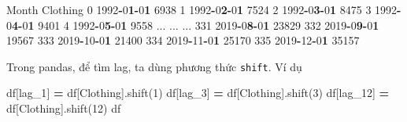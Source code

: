 \documentclass[
]{book}
\newenvironment{Shaded}{\begin{snugshade}}{\end{snugshade}}
\newcommand{\DecValTok}[1]{\textcolor[rgb]{0.00,0.00,0.81}{#1}}
\newcommand{\ErrorTok}[1]{\textcolor[rgb]{0.64,0.00,0.00}{\textbf{#1}}}
\newcommand{\NormalTok}[1]{#1}
\newcommand{\OperatorTok}[1]{\textcolor[rgb]{0.81,0.36,0.00}{\textbf{#1}}}
\newcommand{\StringTok}[1]{\textcolor[rgb]{0.31,0.60,0.02}{#1}}
\begin{document}
\begin{Shaded}
\begin{Highlighting}[]
\NormalTok{         Month  Clothing}
\DecValTok{0}   \DecValTok{1992}\OperatorTok{{-}}\DecValTok{0}\ErrorTok{1}\OperatorTok{{-}}\DecValTok{0}\ErrorTok{1}  \DecValTok{6938}
\DecValTok{1}   \DecValTok{1992}\OperatorTok{{-}}\DecValTok{0}\ErrorTok{2}\OperatorTok{{-}}\DecValTok{0}\ErrorTok{1}  \DecValTok{7524}
\DecValTok{2}   \DecValTok{1992}\OperatorTok{{-}}\DecValTok{0}\ErrorTok{3}\OperatorTok{{-}}\DecValTok{0}\ErrorTok{1}  \DecValTok{8475}
\DecValTok{3}   \DecValTok{1992}\OperatorTok{{-}}\DecValTok{0}\ErrorTok{4}\OperatorTok{{-}}\DecValTok{0}\ErrorTok{1}  \DecValTok{9401}
\DecValTok{4}   \DecValTok{1992}\OperatorTok{{-}}\DecValTok{0}\ErrorTok{5}\OperatorTok{{-}}\DecValTok{0}\ErrorTok{1}  \DecValTok{9558}
\NormalTok{... ... ...}
\DecValTok{331} \DecValTok{2019}\OperatorTok{{-}}\DecValTok{0}\ErrorTok{8}\OperatorTok{{-}}\DecValTok{0}\ErrorTok{1}  \DecValTok{23829}
\DecValTok{332} \DecValTok{2019}\OperatorTok{{-}}\DecValTok{0}\ErrorTok{9}\OperatorTok{{-}}\DecValTok{0}\ErrorTok{1}  \DecValTok{19567}
\DecValTok{333} \DecValTok{2019}\OperatorTok{{-}}\DecValTok{10}\OperatorTok{{-}}\DecValTok{0}\ErrorTok{1}  \DecValTok{21400}
\DecValTok{334} \DecValTok{2019}\OperatorTok{{-}}\DecValTok{11}\OperatorTok{{-}}\DecValTok{0}\ErrorTok{1}  \DecValTok{25170}
\DecValTok{335} \DecValTok{2019}\OperatorTok{{-}}\DecValTok{12}\OperatorTok{{-}}\DecValTok{0}\ErrorTok{1}  \DecValTok{35157}
\end{Highlighting}
\end{Shaded}

Trong pandas, để tìm lag, ta dùng phương thức \texttt{shift}. Ví dụ

\begin{Shaded}
\begin{Highlighting}[]
\NormalTok{df[}\StringTok{\textquotesingle{}lag\_1\textquotesingle{}}\NormalTok{] }\OperatorTok{=}\NormalTok{ df[}\StringTok{\textquotesingle{}Clothing\textquotesingle{}}\NormalTok{].shift(}\DecValTok{1}\NormalTok{)}
\NormalTok{df[}\StringTok{\textquotesingle{}lag\_3\textquotesingle{}}\NormalTok{] }\OperatorTok{=}\NormalTok{ df[}\StringTok{\textquotesingle{}Clothing\textquotesingle{}}\NormalTok{].shift(}\DecValTok{3}\NormalTok{)}
\NormalTok{df[}\StringTok{\textquotesingle{}lag\_12\textquotesingle{}}\NormalTok{] }\OperatorTok{=}\NormalTok{ df[}\StringTok{\textquotesingle{}Clothing\textquotesingle{}}\NormalTok{].shift(}\DecValTok{12}\NormalTok{)}
\NormalTok{df}
\end{Highlighting}
\end{Shaded}
\end{document}
